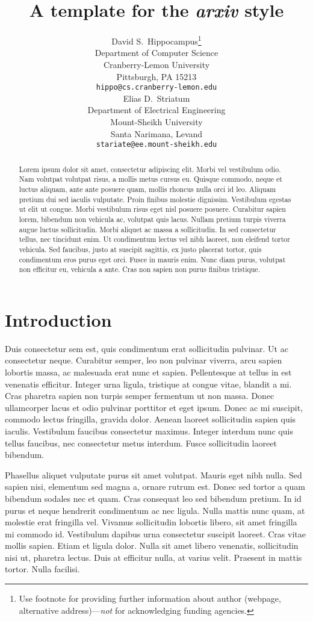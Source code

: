 \documentclass{article}
\title{A template for the \emph{arxiv} style}
\author{
  David S.~Hippocampus\thanks{Use footnote for providing further
    information about author (webpage, alternative
    address)---\emph{not} for acknowledging funding agencies.} \\
  Department of Computer Science\\
  Cranberry-Lemon University\\
  Pittsburgh, PA 15213 \\
  \texttt{hippo@cs.cranberry-lemon.edu} \\
   \And
 Elias D.~Striatum \\
  Department of Electrical Engineering\\
  Mount-Sheikh University\\
  Santa Narimana, Levand \\
  \texttt{stariate@ee.mount-sheikh.edu} \\
}
\begin{document}
\maketitle

\begin{abstract}
Lorem ipsum dolor sit amet, consectetur adipiscing elit. Morbi vel vestibulum odio. Nam volutpat volutpat risus, a mollis metus cursus eu. Quisque commodo, neque et luctus aliquam, ante ante posuere quam, mollis rhoncus nulla orci id leo. Aliquam pretium dui sed iaculis vulputate. Proin finibus molestie dignissim. Vestibulum egestas ut elit ut congue. Morbi vestibulum risus eget nisl posuere posuere. Curabitur sapien lorem, bibendum non vehicula ac, volutpat quis lacus. Nullam pretium turpis viverra augue luctus sollicitudin. Morbi aliquet ac massa a sollicitudin. In sed consectetur tellus, nec tincidunt enim. Ut condimentum lectus vel nibh laoreet, non eleifend tortor vehicula. Sed faucibus, justo at suscipit sagittis, ex justo placerat tortor, quis condimentum eros purus eget orci. Fusce in mauris enim. Nunc diam purus, volutpat non efficitur eu, vehicula a ante. Cras non sapien non purus finibus tristique. 
\end{abstract}




\section{Introduction}
Duis consectetur sem est, quis condimentum erat sollicitudin pulvinar. Ut ac consectetur neque. Curabitur semper, leo non pulvinar viverra, arcu sapien lobortis massa, ac malesuada erat nunc et sapien. Pellentesque at tellus in est venenatis efficitur. Integer urna ligula, tristique at congue vitae, blandit a mi. Cras pharetra sapien non turpis semper fermentum ut non massa. Donec ullamcorper lacus et odio pulvinar porttitor et eget ipsum. Donec ac mi suscipit, commodo lectus fringilla, gravida dolor. Aenean laoreet sollicitudin sapien quis iaculis. Vestibulum faucibus consectetur maximus. Integer interdum nunc quis tellus faucibus, nec consectetur metus interdum. Fusce sollicitudin laoreet bibendum. 


Phasellus aliquet vulputate purus sit amet volutpat. Mauris eget nibh nulla. Sed sapien nisi, elementum sed magna a, ornare rutrum est. Donec sed tortor a quam bibendum sodales nec et quam. Cras consequat leo sed bibendum pretium. In id purus et neque hendrerit condimentum ac nec ligula. Nulla mattis nunc quam, at molestie erat fringilla vel. Vivamus sollicitudin lobortis libero, sit amet fringilla mi commodo id. Vestibulum dapibus urna consectetur suscipit laoreet. Cras vitae mollis sapien. Etiam et ligula dolor. Nulla sit amet libero venenatis, sollicitudin nisi ut, pharetra lectus. Duis at efficitur nulla, at varius velit. Praesent in mattis tortor. Nulla facilisi. 
\end{document}
